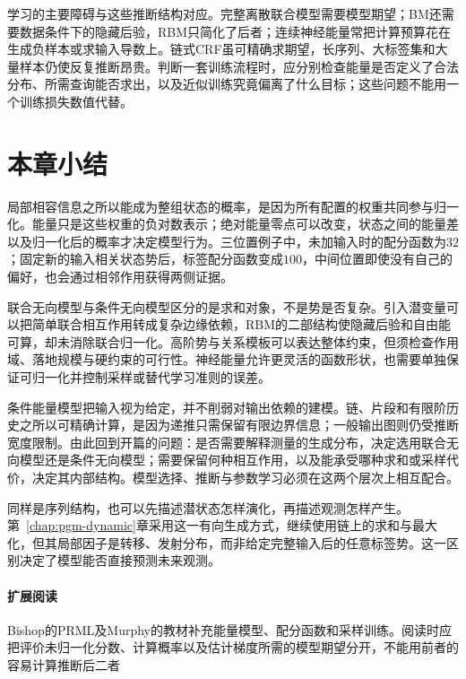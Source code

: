学习的主要障碍与这些推断结构对应。完整离散联合模型需要模型期望；BM还需要数据条件下的隐藏后验，RBM只简化了后者；连续神经能量常把计算预算花在生成负样本或求输入导数上。链式CRF虽可精确求期望，长序列、大标签集和大量样本仍使反复推断昂贵。判断一套训练流程时，应分别检查能量是否定义了合法分布、所需查询能否求出，以及近似训练究竟偏离了什么目标；这些问题不能用一个训练损失数值代替。

\section{本章小结}
\label{sec:pgm-energy-models-summary}

局部相容信息之所以能成为整组状态的概率，是因为所有配置的权重共同参与归一化。能量只是这些权重的负对数表示；绝对能量零点可以改变，状态之间的能量差以及归一化后的概率才决定模型行为。三位置例子中，未加输入时的配分函数为$32$；固定新的输入相关状态势后，标签配分函数变成$100$，中间位置即使没有自己的偏好，也会通过相邻作用获得两侧证据。

联合无向模型与条件无向模型区分的是求和对象，不是势是否复杂。引入潜变量可以把简单联合相互作用转成复杂边缘依赖，RBM的二部结构使隐藏后验和自由能可算，却未消除联合归一化。高阶势与关系模板可以表达整体约束，但须检查作用域、落地规模与硬约束的可行性。神经能量允许更灵活的函数形状，也需要单独保证可归一化并控制采样或替代学习准则的误差。

条件能量模型把输入视为给定，并不削弱对输出依赖的建模。链、片段和有限阶历史之所以可精确计算，是因为递推只需保留有限边界信息；一般输出图则仍受推断宽度限制。由此回到开篇的问题：是否需要解释测量的生成分布，决定选用联合无向模型还是条件无向模型；需要保留何种相互作用，以及能承受哪种求和或采样代价，决定其内部结构。模型选择、推断与参数学习必须在这两个层次上相互配合。

同样是序列结构，也可以先描述潜状态怎样演化，再描述观测怎样产生。第~\ref{chap:pgm-dynamic}章采用这一有向生成方式，继续使用链上的求和与最大化，但其局部因子是转移、发射分布，而非给定完整输入后的任意标签势。这一区别决定了模型能否直接预测未来观测。

\paragraph{扩展阅读}
Bishop的PRML及Murphy的教材补充能量模型、配分函数和采样训练。阅读时应把评价未归一化分数、计算概率以及估计梯度所需的模型期望分开，不能用前者的容易计算推断后二者
